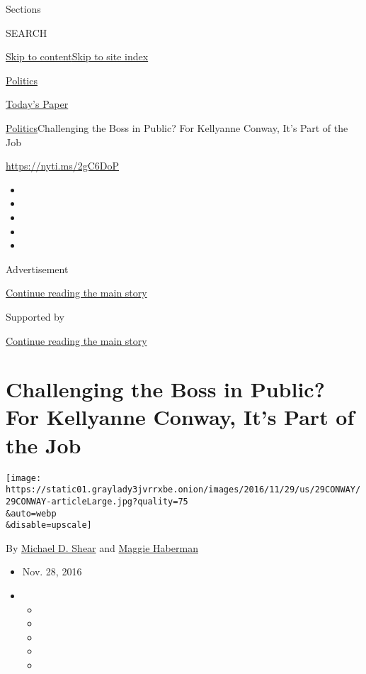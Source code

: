 Sections

SEARCH

\protect\hyperlink{site-content}{Skip to
content}\protect\hyperlink{site-index}{Skip to site index}

\href{https://www.nytimes3xbfgragh.onion/section/politics}{Politics}

\href{https://myaccount.nytimes3xbfgragh.onion/auth/login?response_type=cookie\&client_id=vi}{}

\href{https://www.nytimes3xbfgragh.onion/section/todayspaper}{Today's
Paper}

\href{/section/politics}{Politics}\textbar{}Challenging the Boss in
Public? For Kellyanne Conway, It's Part of the Job

\url{https://nyti.ms/2gC6DoP}

\begin{itemize}
\item
\item
\item
\item
\item
\end{itemize}

Advertisement

\protect\hyperlink{after-top}{Continue reading the main story}

Supported by

\protect\hyperlink{after-sponsor}{Continue reading the main story}

\hypertarget{challenging-the-boss-in-public-for-kellyanne-conway-its-part-of-the-job}{%
\section{Challenging the Boss in Public? For Kellyanne Conway, It's Part
of the
Job}\label{challenging-the-boss-in-public-for-kellyanne-conway-its-part-of-the-job}}

\texttt{[image: https://static01.graylady3jvrrxbe.onion/images/2016/11/29/us/29CONWAY/29CONWAY-articleLarge.jpg?quality=75\\\&auto=webp\\\&disable=upscale]}

By \href{http://www.nytimes3xbfgragh.onion/by/michael-d-shear}{Michael
D. Shear} and
\href{http://www.nytimes3xbfgragh.onion/by/maggie-haberman}{Maggie
Haberman}

\begin{itemize}
\item
  Nov. 28, 2016
\item
  \begin{itemize}
  \item
  \item
  \item
  \item
  \item
  \end{itemize}
\end{itemize}

